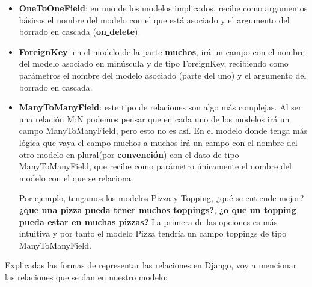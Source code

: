         \begin{itemize}
            \item \textbf{OneToOneField}: en uno de los modelos implicados, recibe como
            argumentos básicos el nombre del modelo con el que está asociado y el argumento
            del borrado en cascada (\textbf{on\underline{ }delete}).
            \item \textbf{ForeignKey}: en el modelo de la parte \textbf{muchos}, irá un campo
            con el nombre del modelo asociado en minúscula y de tipo ForeignKey, recibiendo
            como parámetros el nombre del modelo asociado (parte del uno) y el argumento del
            borrado en cascada.
            \item \textbf{ManyToManyField}: este tipo de relaciones son algo más complejas. Al
            ser una relación M:N podemos pensar que en cada uno de los modelos irá un campo
            ManyToManyField, pero esto no es así. En el modelo donde tenga más lógica que vaya
            el campo muchos a muchos irá un campo con el nombre del otro modelo en plural(por
            \textbf{convención}) con el dato de tipo ManyToManyField, que recibe como parámetro
            únicamente el nombre del modelo con el que se relaciona.

            Por ejemplo, tengamos los modelos Pizza y Topping, ¿qué se entiende mejor?
            \textbf{¿que una pizza pueda tener muchos toppings?}, \textbf{¿o que un
            topping pueda estar en muchas pizzas?} La primera de las opciones es más
            intuitiva y por tanto el modelo Pizza tendría un campo toppings de tipo
            ManyToManyField.
        \end{itemize}

    Explicadas las formas de representar las relaciones en Django, voy a mencionar las
    relaciones que se dan en nuestro modelo:

